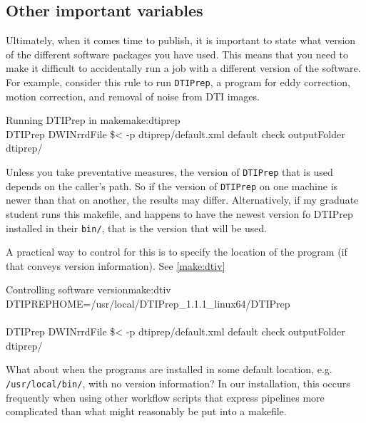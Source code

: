 \subsection{Other important variables}
Ultimately, when it comes time to publish, it is important to state what version of the different software packages you have used. This means that you need to make it difficult to accidentally run a job with a different version of the software. For example, consider this rule to run \texttt{DTIPrep}, a program for eddy correction, motion correction, and removal of noise from DTI images. %

\begin{make}{Running DTIPrep in make}{make:dtiprep}
	 \\
	\tab DTIPrep \dd DWINrrdFile \$< -p dtiprep/default.xml \dd default \dd check \dd outputFolder dtiprep/ \\
\end{make}

Unless you take preventative measures, the version of \texttt{DTIPrep} that is used depends on the caller's path. So if the version of \texttt{DTIPrep} on one machine is newer than that on another, the results may differ. Alternatively, if my graduate student runs this makefile, and happens to have the newest version fo DTIPrep installed in their \texttt{bin/}, that is the version that will be used.

A practical way to control for this is to specify the location of the program (if that conveys version information). See \autoref{make:dtiv}

\begin{make}{Controlling software version}{make:dtiv}
	DTIPREPHOME=/usr/local/DTIPrep_1.1.1_linux64/DTIPrep \\
	
	 \\
	\tab DTIPrep \dd DWINrrdFile \$< -p dtiprep/default.xml \dd default \dd check \dd outputFolder dtiprep/ \\	
\end{make}

What about when the programs are installed in some default location, e.g. \texttt{/usr/local/bin/}, with no version information? In our installation, this occurs frequently when using other workflow scripts that express pipelines more complicated than what might reasonably be put into a makefile.

